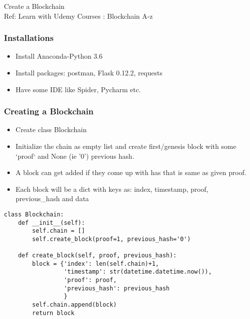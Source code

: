 \begin{frame}[fragile]\frametitle{}
\begin{center}
{\Large Create a Blockchain}\\
{\small Ref: Learn with Udemy Courses : Blockchain A-z}
\end{center}
\end{frame}

\begin{frame}[fragile]\frametitle{Installations}
\begin{itemize}
\item Install Anaconda-Python 3.6
\item Install packages: postman, Flask 0.12.2, requests
\item Have some IDE like Spider, Pycharm etc.
\end{itemize}
\end{frame}

\begin{frame}[fragile]\frametitle{Creating a Blockchain}
\begin{itemize}
\item Create class Blockchain
\item Initialize the chain as empty list and create first/genesis block with some `proof` and None (ie '0') previous hash.
\item A block can get added if they come up with has that is same as given proof.
\item Each block will be a dict with keys as: index, timestamp, proof, previous\_hash and data
\end{itemize}

\begin{lstlisting}
class Blockchain:
    def __init__(self):
        self.chain = []
        self.create_block(proof=1, previous_hash='0')

    def create_block(self, proof, previous_hash):
        block = {'index': len(self.chain)+1,
                 'timestamp': str(datetime.datetime.now()),
                 'proof': proof,
                 'previous_hash': previous_hash
                 }
        self.chain.append(block)
        return block
\end{lstlisting}
\end{frame}


